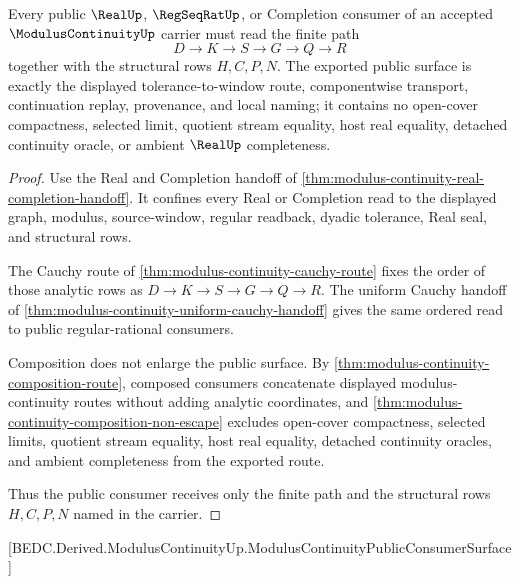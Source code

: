\begin{theorem}
\label{thm:modulus-continuity-public-consumer-surface}
Every public $\RealUp$, $\RegSeqRatUp$, or Completion consumer of an accepted $\ModulusContinuityUp$ carrier must read the finite path
$$
D \to K \to S \to G \to Q \to R
$$
together with the structural rows $H,C,P,N$. The exported public surface is exactly the displayed tolerance-to-window route, componentwise transport, continuation replay, provenance, and local naming; it contains no open-cover compactness, selected limit, quotient stream equality, host real equality, detached continuity oracle, or ambient $\RealUp$ completeness.
\end{theorem}
\begin{proof}
Use the Real and Completion handoff of \autoref{thm:modulus-continuity-real-completion-handoff}. It confines every Real or Completion read to the displayed graph, modulus, source-window, regular readback, dyadic tolerance, Real seal, and structural rows.

The Cauchy route of \autoref{thm:modulus-continuity-cauchy-route} fixes the order of those analytic rows as $D \to K \to S \to G \to Q \to R$. The uniform Cauchy handoff of \autoref{thm:modulus-continuity-uniform-cauchy-handoff} gives the same ordered read to public regular-rational consumers.

Composition does not enlarge the public surface. By \autoref{thm:modulus-continuity-composition-route}, composed consumers concatenate displayed modulus-continuity routes without adding analytic coordinates, and \autoref{thm:modulus-continuity-composition-non-escape} excludes open-cover compactness, selected limits, quotient stream equality, host real equality, detached continuity oracles, and ambient completeness from the exported route.

Thus the public consumer receives only the finite path and the structural rows $H,C,P,N$ named in the carrier.
\end{proof}

[BEDC.Derived.ModulusContinuityUp.ModulusContinuityPublicConsumerSurface]

